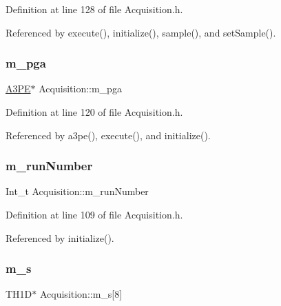 Definition at line 128 of file Acquisition.\+h.



Referenced by execute(), initialize(), sample(), and set\+Sample().

\mbox{\label{classAcquisition_aac113fd42c6574cdb4154e9808a21b67}} 
\subsubsection{\texorpdfstring{m\+\_\+pga}{m\_pga}}
{\footnotesize\ttfamily \hyperlink{classA3PE}{A3\+PE}$\ast$ Acquisition\+::m\+\_\+pga\hspace{0.3cm}{\ttfamily [private]}}



Definition at line 120 of file Acquisition.\+h.



Referenced by a3pe(), execute(), and initialize().

\mbox{\label{classAcquisition_afd35e220e0bfda7e763584524273aeb0}} 
\subsubsection{\texorpdfstring{m\+\_\+run\+Number}{m\_runNumber}}
{\footnotesize\ttfamily Int\+\_\+t Acquisition\+::m\+\_\+run\+Number\hspace{0.3cm}{\ttfamily [private]}}



Definition at line 109 of file Acquisition.\+h.



Referenced by initialize().

\mbox{\label{classAcquisition_a15d71455f658e21a12ef4c153c21df65}} 
\subsubsection{\texorpdfstring{m\+\_\+s}{m\_s}}
{\footnotesize\ttfamily T\+H1D$\ast$ Acquisition\+::m\+\_\+s\mbox{[}8\mbox{]}\hspace{0.3cm}{\ttfamily [private]}}



